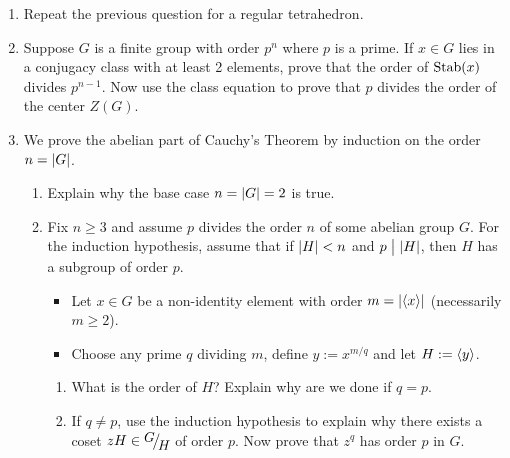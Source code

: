 \begin{exercises}{}{}
\begin{enumerate}
	
		\item Repeat the previous question for a regular tetrahedron.
		
		
		
		\item Suppose $G$ is a finite group with order $p^n$ where $p$ is a prime. If $x\in G$ lies in a conjugacy class with at least 2 elements, prove that the order of $\operatorname{Stab}(x)$ divides $p^{n-1}$. Now use the class equation to prove that $p$ divides the order of the center $Z(G)$.
	
		
		\item\label{exs:cauchysthmabelian} We prove the abelian part of Cauchy's Theorem by induction on the order $n=\left| G\right|$.
		\begin{enumerate}
		  \item Explain why the base case $n=\left| G\right|=2$ is true.
		  \item Fix $n\ge 3$ and assume $p$ divides the order $n$ of some abelian group $G$. For the induction hypothesis, assume that if $\left| H\right|<n$ and $p\bigm|\left| H\right|$, then $H$ has a subgroup of order $p$. %
		  \begin{itemize}
				\item Let $x\in G$ be a non-identity element with order $m=\left| \left\langle x\right\rangle\right|$ (necessarily $m\ge 2$).
				\item Choose any prime $q$ dividing $m$, define $y:=x^{m/q}$ and let $H:=\left\langle y\right\rangle$.
			\end{itemize}
			\begin{enumerate}
			  \item What is the order of $H$? Explain why are we done if $q=p$.
		  	\item If $q\neq p$, use the induction hypothesis to explain why there exists a coset $zH\in \quotient GH$ of order $p$. Now prove that $z^q$ has order $p$ in $G$.
		  \end{enumerate}
		\end{enumerate}
		
		
		

\end{enumerate}
\end{exercises}
